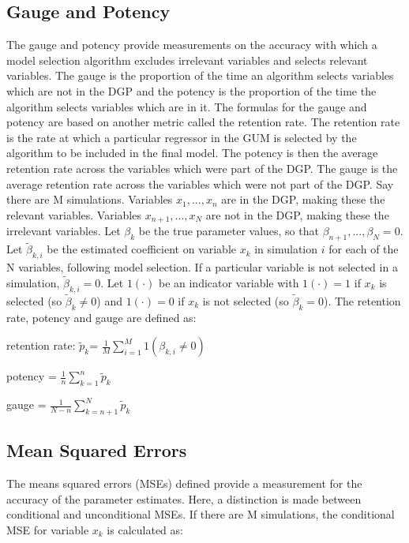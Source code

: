 \documentclass[11pt, oneside]{book}   	%
\begin{document}
\subsection{Gauge and Potency}
The gauge and potency provide measurements on the accuracy with which a model selection algorithm excludes irrelevant variables and selects relevant variables. The gauge is the proportion of the time an algorithm selects variables which are not in the DGP and the potency is the proportion of the time the algorithm selects variables which are in it. The formulas for the gauge and potency are based on another metric called the retention rate. The retention rate is the rate at which a particular regressor in the GUM is selected by the algorithm to be included in the final model. The potency is then the average retention rate across the variables which were part of the DGP. The gauge is the average retention rate across the variables which were not part of the DGP. Say there are M simulations. Variables $x_{1},...,x_{n}$ are in the DGP, making these the relevant variables. Variables $x_{n+1},...,x_{N}$ are not in the DGP, making these the irrelevant variables. Let $\beta_{k}$ be the true parameter values, so that $\beta_{n+1},...,\beta_{N}=0$. Let $\tilde\beta_{k,i}$ be the estimated coefficient on variable $x_{k}$ in simulation $i$  for each of the N variables, following model selection. If a particular variable is not selected in a simulation, $\tilde\beta_{k,i}=0$. Let $1(\cdot)$ be an indicator variable with $1(\cdot)=1$ if $x_{k}$ is selected (so $\tilde\beta_{k}\neq 0$) and $1(\cdot) = 0$ if $x_{k}$ is not selected (so $\tilde\beta_{k}=0$). The retention rate, potency and gauge are defined as: 

\hspace{1cm}
\centerline{retention rate: $  \tilde p_{k} $= \( \frac{1}{M} \)$\sum_{i=1}^{M}1(\beta_{k,i} \neq 0)$}
\hfill
\centerline{potency = \( \frac{1}{n} \)$\sum_{k=1}^{n} \tilde p_{k}$}
\hfill
\centerline{gauge = \( \frac{1}{N-n} \)$\sum_{k=n+1}^{N} \tilde p_{k}$}
\hfill




\subsection{Mean Squared Errors}



The means squared errors (MSEs) defined provide a measurement for the accuracy of the parameter estimates. Here, a distinction is made between conditional and unconditional MSEs. If there are M simulations, the conditional MSE for variable $x_{k}$ is calculated as:
\end{document}

